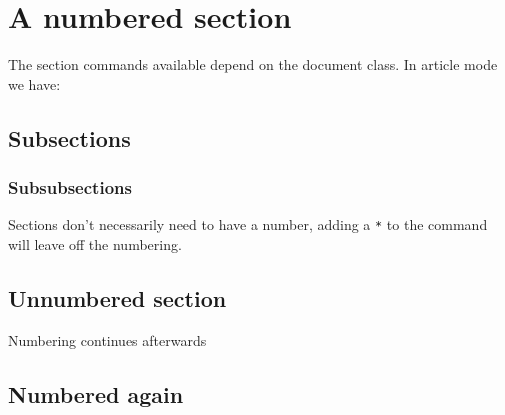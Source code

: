 \documentclass{article}
\begin{document}
	\section{A numbered section}
	The section commands available depend on the document class.  In article mode we have:
	
	\subsection{Subsections}
	\subsubsection{Subsubsections}
	
	Sections don't necessarily need to have a number, adding a \verb|*| to the command will leave off the numbering.
	
	\subsection*{Unnumbered section}
	
	Numbering continues afterwards
	
	\subsection{Numbered again}
\end{document}
